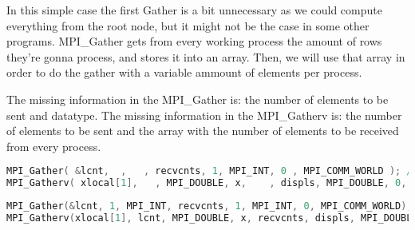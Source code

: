\documentclass[a4paper, 10pt]{article}
\begin{document}
In this simple case the first Gather is a bit unnecessary as we could compute everything from the root node, but it might not be the case in some other programs. MPI\_Gather gets from every working process the amount of rows they're gonna process, and stores it into an array. Then, we will use that array in order to do the gather with a variable ammount of elements per process.

The missing information in the MPI\_Gather is: the number of elements to be sent and datatype.
The missing information in the MPI\_Gatherv is: the number of elements to be sent and the array with the number of elements to be received from every process.
    \begin{lstlisting}[language=c, caption={Template S23, S24}]
MPI_Gather( &lcnt,  ,   , recvcnts, 1, MPI_INT, 0 , MPI_COMM_WORLD ); /* Statement S23 */
MPI_Gatherv( xlocal[1],   , MPI_DOUBLE, x,    , displs, MPI_DOUBLE, 0, MPI_COMM_WORLD ); /* Statement S24 */
    \end{lstlisting}

    \begin{lstlisting}[language=c, caption={Correct S23, S24}]
MPI_Gather(&lcnt, 1, MPI_INT, recvcnts, 1, MPI_INT, 0, MPI_COMM_WORLD); /* Statement S23 */
MPI_Gatherv(xlocal[1], lcnt, MPI_DOUBLE, x, recvcnts, displs, MPI_DOUBLE, 0, MPI_COMM_WORLD); /* S24 */
    \end{lstlisting}
\end{document}
